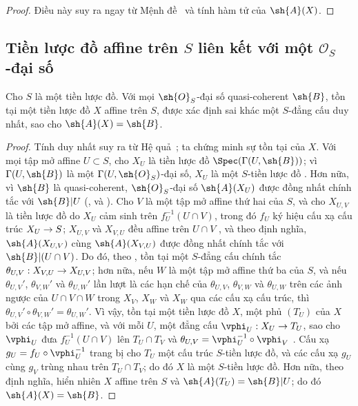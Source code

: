 \documentclass[oneside,10pt]{amsart}
\makeatletter
\newcommand{\ega@arrow}[2]{\mathchoice{#1}{#2}{#2}{#2}}
\renewcommand{\to}{\ega@arrow{\longrightarrow}{\rightarrow}}
\let\EGAOriginalLabel\label
\renewcommand{\label}[1]{\phantomsection\EGAOriginalLabel{#1}}
\makeatother
\begin{document}
\begin{proof}
Điều này suy ra ngay từ Mệnh đề~ và tính hàm tử của $\sh{A}(X)$.
\end{proof}

\subsection{Tiền lược đồ affine trên $S$ liên kết với một $\mathcal{O}_S$-đại số}
\label{subsection:II.1.3}
\label{II.1.3}

\begin{proposition}[1.3.1]
\label{II.1.3.1}
Cho $S$ là một tiền lược đồ.
Với mọi $\sh{O}_S$-đại số quasi-coherent $\sh{B}$, tồn tại một tiền lược đồ $X$ affine trên $S$, được xác định sai khác một $S$-đẳng cấu duy nhất, sao cho $\sh{A}(X)=\sh{B}$.
\end{proposition}

\begin{proof}
Tính duy nhất suy ra từ Hệ quả~; ta chứng minh sự tồn tại của $X$.
Với mọi tập mở affine $U\subset S$, cho $X_U$ là tiền lược đồ $\Spec(\Gamma(U,\sh{B}))$; vì $\Gamma(U,\sh{B})$ là một $\Gamma(U,\sh{O}_S)$-đại số, $X_U$ là một $S$-tiền lược đồ .
Hơn nữa, vì $\sh{B}$ là quasi-coherent, $\sh{O}_S$-đại số $\sh{A}(X_U)$ được đồng nhất chính tắc với $\sh{B}|U$ (,  và ).
Cho $V$ là một tập mở affine thứ hai của $S$, và cho $X_{U,V}$ là tiền lược đồ do $X_U$ cảm sinh trên $f_U^{-1}(U\cap V)$, trong đó $f_U$ ký hiệu cấu xạ cấu trúc $X_U\to S$; $X_{U,V}$ và $X_{V,U}$ đều affine trên $U\cap V$ , và theo định nghĩa, $\sh{A}(X_{U,V})$ cùng $\sh{A}(X_{V,U})$ được đồng nhất chính tắc với $\sh{B}|(U\cap V)$.
Do đó, theo , tồn tại một $S$-đẳng cấu chính tắc $\theta_{U,V}:X_{V,U}\to X_{U,V}$; hơn nữa, nếu $W$ là một tập mở affine thứ ba của $S$, và nếu $\theta_{U,V}'$, $\theta_{V,W}'$ và $\theta_{U,W}'$ lần lượt là các hạn chế của $\theta_{U,V}$, $\theta_{V,W}$ và $\theta_{U,W}$ trên các ảnh ngược của $U\cap V\cap W$ trong $X_V$, $X_W$ và $X_W$ qua các cấu xạ cấu trúc, thì $\theta_{U,V}'\circ\theta_{V,W}'=\theta_{U,W}'$.
Vì vậy, tồn tại một tiền lược đồ $X$, một phủ $(T_U)$ của $X$ bởi các tập mở affine, và với mỗi $U$, một đẳng cấu $\vphi_U:X_U\to T_U$, sao cho $\vphi_U$ đưa $f_U^{-1}(U\cap V)$ lên $T_U\cap T_V$ và $\theta_{U,V}=\vphi_U^{-1}\circ\vphi_V$ .
Cấu xạ $g_U=f_U\circ\vphi_U^{-1}$ trang bị cho $T_U$ một cấu trúc $S$-tiền lược đồ, và các cấu xạ $g_U$ cùng $g_V$ trùng nhau trên $T_U\cap T_V$; do đó $X$ là một $S$-tiền lược đồ.
Hơn nữa, theo định nghĩa, hiển nhiên $X$ affine trên $S$ và $\sh{A}(T_U)=\sh{B}|U$; do đó $\sh{A}(X)=\sh{B}$.
\end{proof}
\end{document}
